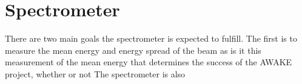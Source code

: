 
\section{Spectrometer}
\label{sec:spectrometer}

There are two main goals the spectrometer is expected to fulfill. The first is
to measure the mean energy and energy spread of the beam as is it this
measurement of the mean energy that determines the success of the AWAKE project, 
whether or not 
The spectrometer is also 

